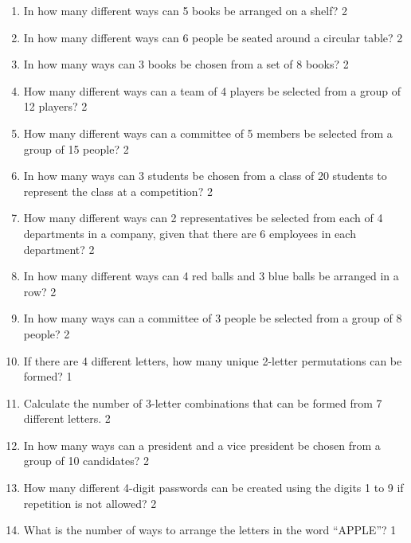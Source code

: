 \documentclass[a4paper,oneside, margin=1.4in]{book}
\begin{document}
\begin{enumerate}
\item In how many different ways can 5 books be arranged on a shelf? \hfill 2

\item
In how many different ways can 6 people be seated around a circular table? \hfill 2

\item
In how many ways can 3 books be chosen from a set of 8 books? \hfill 2

\item
How many different ways can a team of 4 players be selected from a group of 12 players? \hfill 2

\item
How many different ways can a committee of 5 members be selected from a group of 15 people? \hfill 2

\item
In how many ways can 3 students be chosen from a class of 20 students to represent the class at a competition? \hfill 2

\item
How many different ways can 2 representatives be selected from each of 4 departments in a company, given that there are 6 employees in each department? \hfill 2


\item
In how many different ways can 4 red balls and 3 blue balls be arranged in a row? \hfill 2


\item In how many ways can a committee of 3 people be selected from a group of 8 people? \hfill 2

\item If there are 4 different letters, how many unique 2-letter permutations can be formed? \hfill 1

\item Calculate the number of 3-letter combinations that can be formed from 7 different letters. \hfill 2

\item In how many ways can a president and a vice president be chosen from a group of 10 candidates? \hfill 2

\item How many different 4-digit passwords can be created using the digits 1 to 9 if repetition is not allowed? \hfill 2

\item What is the number of ways to arrange the letters in the word “APPLE”? \hfill 1


\end{enumerate}
\end{document}
